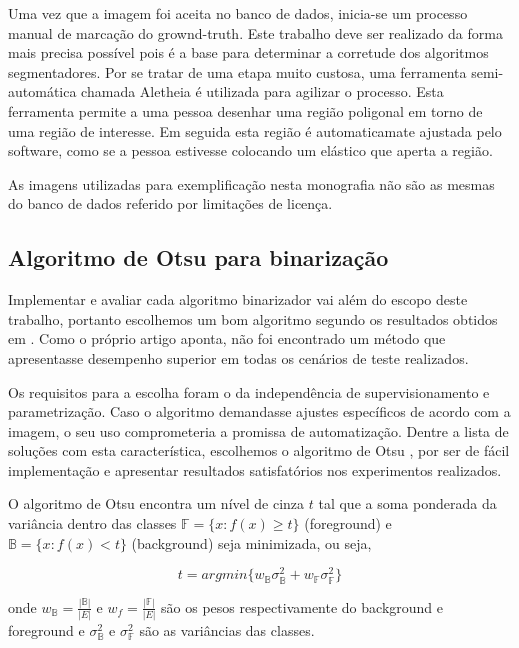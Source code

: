 \documentclass[a4paper,11pt]{article}
\begin{document}
      Uma vez que a imagem foi aceita no banco de dados, inicia-se um processo manual de marcação do grownd-truth. Este trabalho deve ser realizado da forma mais precisa possível pois é a base para determinar a corretude dos algoritmos segmentadores. Por se tratar de uma etapa muito custosa, uma ferramenta semi-automática chamada Aletheia é utilizada para agilizar o processo. Esta ferramenta permite a uma pessoa desenhar uma região poligonal em torno de uma região de interesse. Em seguida esta região é automaticamate ajustada pelo software, como se a pessoa estivesse colocando um elástico que aperta a região.

      As imagens utilizadas para exemplificação nesta monografia não são as mesmas do banco de dados referido por limitações de licença.

    \subsection{Algoritmo de Otsu para binarização}

      Implementar e avaliar cada algoritmo binarizador vai além do escopo deste trabalho, portanto escolhemos um bom algoritmo segundo os resultados obtidos em \cite{citeulike:890354}. Como o próprio artigo aponta, não foi encontrado um método que apresentasse desempenho superior em todas os cenários de teste realizados.

      Os requisitos para a escolha foram o da independência de supervisionamento e parametrização. Caso o algoritmo demandasse ajustes específicos de acordo com a imagem, o seu uso comprometeria a promissa de automatização. Dentre a lista de soluções com esta característica, escolhemos o algoritmo de Otsu \cite{1979:ots}, por ser de fácil implementação e apresentar resultados satisfatórios nos experimentos realizados.

      O algoritmo de Otsu encontra um nível de cinza $t$ tal que a soma ponderada da variância dentro das classes $\mathbb{F} = \{ x \colon f(x) \geq t \}$ (foreground) e $\mathbb{B} = \{ x \colon f(x) < t \}$ (background) seja minimizada, ou seja,

      \begin{equation}
        t = argmin \{ w_\mathbb{B} \sigma^{2}_{\mathbb{B}} + w_\mathbb{F} \sigma^{2}_{\mathbb{F}} \}
      \end{equation}

      onde $w_\mathbb{B} = \frac{|\mathbb{B}|}{|E|}$ e $w_f = \frac{|\mathbb{F}|}{|E|}$ são os pesos respectivamente do background e foreground e $\sigma^{2}_{\mathbb{B}}$ e $\sigma^{2}_{\mathbb{F}}$ são as variâncias das classes.
\end{document}
